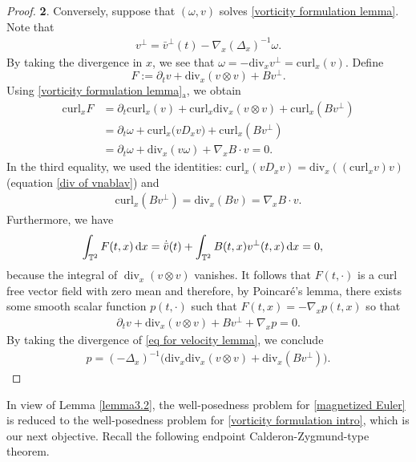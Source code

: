 \documentclass[11pt,reqno]{amsart}
\numberwithin{equation}{section}
\def\dd{{\rm d}}
\begin{document}
\begin{proof}
\smallskip
\textbf{2}. Conversely, suppose that $(\omega,v)$ solves
\eqref{vorticity formulation lemma}. 
Note that 
\begin{align*}
v^{\perp}=\bar{v}^{\perp}(t)-\nabla_{x}(\Delta_{x})^{-1}\omega.    
\end{align*}
By taking the divergence in $x$, we see that
$\omega=-\mathrm{div}_{x}v^{\perp}=\mathrm{curl}_{x}(v)$. 
Define
\[
F:=
\partial_tv
+\mathrm{div}_x(v\otimes v)
+Bv^\perp.
\]
Using \eqref{vorticity formulation lemma}$_{\mathrm{a}}$, we obtain
\[
\begin{aligned}
\mathrm{curl}_xF&= \partial_{t}\mathrm{curl}_{x}(v)+\mathrm{curl}_{x}\mathrm{div}_{x}(v\otimes v)+\mathrm{curl}_{x}(Bv^{\perp})
\\&=
\partial_t\omega
+\mathrm{curl}_x\bigl(vD_xv\bigr)
+\mathrm{curl}_x(Bv^\perp)\\
&=
\partial_t\omega
+\mathrm{div}_x(v\omega)
+\nabla_xB\cdot v=0.
\end{aligned}
\]
In the third equality, we used the identities: $\mathrm{curl}_{x}(vD_{x}v)=\mathrm{div}_{x}((\mathrm{curl}_{x}v)v)$ (equation \eqref{div of vnablav}) and 
\begin{align*}
\mathrm{curl}_{x}(Bv^{\perp})=\mathrm{div}_{x}(Bv)=\nabla_{x}B\cdot v.     
\end{align*}
Furthermore, we have
\[
\begin{aligned}
\int_{\mathbb T^2}F(t,x)\,\dd x
&=
\dot{\bar{v}}(t)
+\int_{\mathbb T^2}B(t,x)v^\perp(t,x)\,\dd x=0,
\end{aligned}
\]
because the integral of
$\operatorname{div}_x(v\otimes v)$ vanishes. 
It follows that $F(t,\cdot)$ is a curl free vector 
field with zero
mean and therefore, by Poincar\'e's lemma, there exists some smooth scalar function 
$p(t,\cdot)$ such that $F(t,x)=-\nabla_{x}p(t,x)$ so that
\begin{align}
\partial_{t}v+\mathrm{div}_{x}(v\otimes v)+Bv^{\perp}+\nabla_{x}p=0.\label{eq for velocity lemma}
\end{align}
By taking the divergence of \eqref{eq for velocity lemma}, we conclude 
\begin{align*}
p=(-\Delta_{x})^{-1}\big(\mathrm{div}_{x}\mathrm{div}_{x}(v\otimes v)
+\mathrm{div}_{x}(Bv^{\perp})\big).    
\end{align*}
\end{proof}

In view of  Lemma \ref{lemma3.2}, the well-posedness problem for \eqref{magnetized Euler} is reduced 
to the well-posedness problem for \eqref{vorticity formulation intro}, 
which is our next objective. Recall the following endpoint Calderon-Zygmund-type theorem.   
\end{document}
